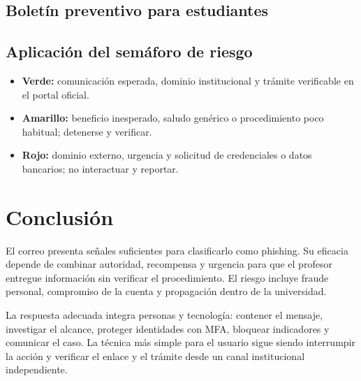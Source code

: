 \documentclass[11pt,a4paper]{article}
\begin{document}
\subsection*{Boletín preventivo para estudiantes}

\noindent{}

\subsection*{Aplicación del semáforo de riesgo}

\begin{itemize}
  \item \textcolor{seguro}{\textbf{Verde:}} comunicación esperada, dominio institucional y trámite verificable en el portal oficial.
  \item \textcolor{turquesa}{\textbf{Amarillo:}} beneficio inesperado, saludo genérico o procedimiento poco habitual; detenerse y verificar.
  \item \textcolor{alerta}{\textbf{Rojo:}} dominio externo, urgencia y solicitud de credenciales o datos bancarios; no interactuar y reportar.
\end{itemize}

\section*{Conclusión}

El correo presenta señales suficientes para clasificarlo como phishing. Su eficacia depende de combinar autoridad, recompensa y urgencia para que el profesor entregue información sin verificar el procedimiento. El riesgo incluye fraude personal, compromiso de la cuenta y propagación dentro de la universidad.

La respuesta adecuada integra personas y tecnología: contener el mensaje, investigar el alcance, proteger identidades con MFA, bloquear indicadores y comunicar el caso. La técnica más simple para el usuario sigue siendo interrumpir la acción y verificar el enlace y el trámite desde un canal institucional independiente.
\end{document}
